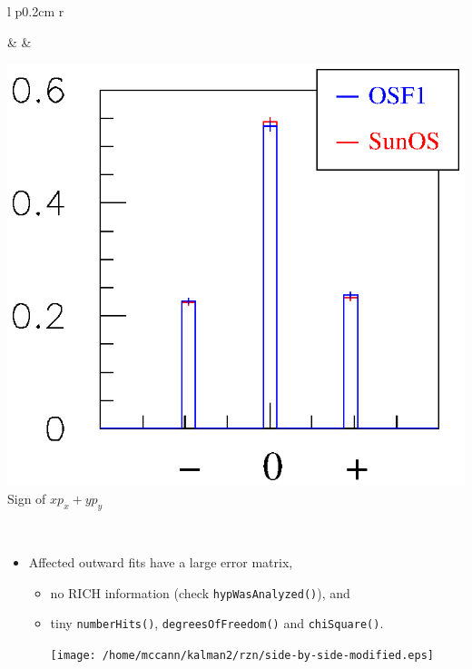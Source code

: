 \begin{slide*}
\begin{minipage}[t]{\linewidth}
\begin{tabular}{l p{0.2cm} r}
\begin{minipage}[b]{0.62\linewidth}
\begin{itemize}
    \end{itemize}
  \end{minipage} & &
  \begin{minipage}[b]{0.3\linewidth}
    \begin{center}
      \includegraphics[width=0.95\linewidth]{xdotp_distributions.eps} \\
      Sign of $x p_x + y p_y$
    \end{center}
  \end{minipage} \\
\end{tabular}

\begin{itemize}

  \item Affected outward fits have a large error matrix,
  \begin{itemize}
    \item no RICH information (check {\tt hypWasAnalyzed()}), and
    \item tiny {\tt numberHits()}, {\tt degreesOfFreedom()}
          and {\tt chiSquare()}.

  \vspace{0.3cm}

  \begin{center}\texttt{[image: /home/mccann/kalman2/rzn/side-by-side-modified.eps]}\end{center}
  \end{itemize}

\end{itemize}

\end{minipage}

\end{slide*}

